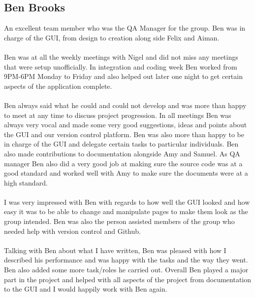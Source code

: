 \documentclass[titlepage]{article}
\begin{document}
{\subsection {Ben Brooks}
An excellent team member who was the QA Manager for the group. Ben was in charge of the GUI, from design to creation along side Felix and Aiman.
\\
\\
Ben was at all the weekly meetings with Nigel and did not miss any meetings that were setup unofficially. In integration and coding week Ben worked from 9PM-6PM Monday to Friday and also helped out later one night to get certain aspects of the application complete.
\\
\\
Ben always said what he could and could not develop and was more than happy to meet at any time to discuss project progression. In all meetings Ben was always very vocal and made some very good suggestions, ideas and points about the GUI and our version control platform. Ben was also more than happy to be in charge of the GUI and delegate certain tasks to particular individuals. Ben also made contributions to documentation alongside Amy and Samuel. As QA manager Ben also did a very good job at making sure the source code was at a good standard and worked well with Amy to make sure the documents were at a high standard. 
\\
\\
I was very impressed with Ben with regards to how well the GUI looked and how easy it was to be
able to change and manipulate pages to make them look as the group intended. Ben was 
also the person assisted members of the group who needed help with version control and Github.
\\
\\
Talking with Ben about what I have written, Ben was pleased with how I described his performance and was 
happy with the tasks and the way they went. Ben also added some more task/roles he carried out.
Overall Ben played a major part in the project and helped with all aspects of the project from 
documentation to the GUI and I would happily work with Ben again. 
}
\end{document}
